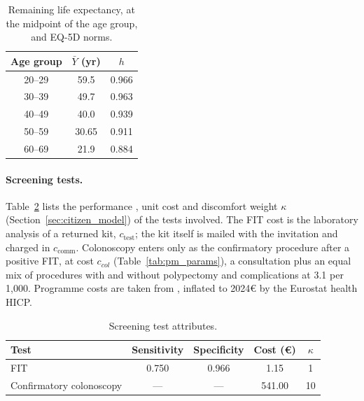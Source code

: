 \documentclass[12pt]{article}
\begin{document}
\begin{table}[htbp]
\centering
\footnotesize
\caption{Remaining life expectancy, at the midpoint of the age group, and EQ-5D norms.}
\label{tab:age_stratified}
\renewcommand{\arraystretch}{1.2}
\begin{tabular}{c c c}
\toprule
\textbf{Age group} & \textbf{$\bar Y$ (yr)} & \textbf{$h$} \\
\midrule
20--29 & 59.5  & 0.966 \\
30--39 & 49.7  & 0.963 \\
40--49 & 40.0  & 0.939 \\
50--59 & 30.65 & 0.911 \\
60--69 & 21.9  & 0.884 \\
\bottomrule
\end{tabular}
\end{table}

\paragraph{Screening tests.} Table~\ref{tab:screening_tests} lists the performance \citep{barre2020cost}, unit cost \citep{arrospide2018cost} and discomfort weight $\kappa$ (Section~\ref{sec:citizen_model}) of the tests involved. The FIT cost is the laboratory analysis of a returned kit, $c_{\text{test}}$; the kit itself is mailed with the invitation and charged in $c_{\text{comm}}$. Colonoscopy enters only as the confirmatory procedure after a positive FIT, at cost $c_{col}$ (Table~\ref{tab:pm_params}), a consultation plus an equal mix of procedures with and without polypectomy and complications at 3.1 per 1{,}000. Programme costs are taken from \citet{arrospide2018cost}, inflated to 2024€ by the Eurostat health HICP.
\begin{table}[h!]
\centering
\footnotesize
\caption{Screening test attributes.}
\label{tab:screening_tests}
\renewcommand{\arraystretch}{1.2}
\begin{tabular}{l c c c c}
\toprule
\textbf{Test} & \textbf{Sensitivity} & \textbf{Specificity} & \textbf{Cost (€)} & $\kappa$ \\
\midrule
FIT                     & 0.750 & 0.966 & 1.15   & 1  \\
Confirmatory colonoscopy & ---   & ---   & 541.00 & 10 \\
\bottomrule
\end{tabular}
\end{table}
\end{document}
